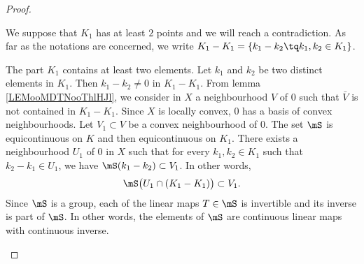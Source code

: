 \begin{proof}
\begin{subproof}
	\end{subproof}
	We suppose that \( K_1\) has at least \( 2\) points and we will reach a contradiction. As far as the notations are concerned, we write \( K_1-K_1=\{ k_1-k_2\tq k_1,k_2\in K_1 \}\).
	\begin{subproof}
		The part \( K_1\) contains at least two elements. Let \( k_1\) and \( k_2\) be two distinct elements in \( K_1\). Then \( k_1-k_2\neq 0\) in \( K_1-K_1\).
		\spitem[Definition of \( V\)]
		From lemma \ref{LEMooMDTNooThlHJl}, we consider in \( X\) a neighbourhood \( V\) of \( 0\) such that \( \bar V\) is not contained in \( K_1-K_1\).
		\spitem[Definition of \( V_1\)]
		Since \( X\) is locally convex, \( 0\) has a basis of convex neighbourhoods. Let \( V_1\subset V\) be a convex neighbourhood of \( 0\).
		\spitem[Definition of \( U_1\)]
		The set \( \mS\) is equicontinuous on \( K\) and then equicontinuous on \( K_1\). There exists a neighbourhood \( U_1\) of \( 0\) in \( X\) such that for every \( k_1,k_2\in K_1\) such that \( k_2-k_1\in U_1\), we have \( \mS(k_1-k_2)\subset  V_1\). In other words,
		\begin{equation}        \label{EQooPELQooJgcrzr}
			\mS\big( U_1\cap(K_1-K_1) \big)\subset V_1.
		\end{equation}
		Since \( \mS\) is a group, each of the linear maps \( T\in\mS\) is invertible and its inverse is part of \( \mS\). In other words, the elements of \( \mS\) are continuous linear maps with continuous inverse.


\end{subproof}
\end{proof}
